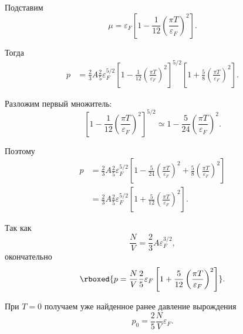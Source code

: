 \documentclass[../final.tex]{subfiles}
\begin{document}
Подставим
%
\begin{equation*}
    \mu
    =
    \varepsilon_F
    \left[
        1
        -
        \frac{1}{12}
        \left(
            \frac{\pi T}{\varepsilon_F}
        \right)^2
    \right].
\end{equation*}

Тогда
%
\begin{align*}
    p
    &=
    \frac{2}{3}A
    \frac{2}{5}
    \varepsilon_F^{5/2}
    \left[
        1
        -
        \frac{1}{12}
        \left(
            \frac{\pi T}{\varepsilon_F}
        \right)^2
    \right]^{5/2}
    \left[
        1
        +
        \frac{5}{8}
        \left(
            \frac{\pi T}{\varepsilon_F}
        \right)^2
    \right].
\end{align*}

Разложим первый множитель:
%
\begin{equation*}
    \left[
        1
        -
        \frac{1}{12}
        \left(
            \frac{\pi T}{\varepsilon_F}
        \right)^2
    \right]^{5/2}
    \simeq
    1
    -
    \frac{5}{24}
    \left(
        \frac{\pi T}{\varepsilon_F}
    \right)^2.
\end{equation*}

Поэтому
%
\begin{align*}
    p
    &=
    \frac{2}{3}A
    \frac{2}{5}
    \varepsilon_F^{5/2}
    \left[
        1
        -
        \frac{5}{24}
        \left(
            \frac{\pi T}{\varepsilon_F}
        \right)^2
        +
        \frac{5}{8}
        \left(
            \frac{\pi T}{\varepsilon_F}
        \right)^2
    \right]
    \\[6pt]
    &=
    \frac{2}{3}A
    \frac{2}{5}
    \varepsilon_F^{5/2}
    \left[
        1
        +
        \frac{5}{12}
        \left(
            \frac{\pi T}{\varepsilon_F}
        \right)^2
    \right].
\end{align*}

Так как
%
\begin{equation*}
    \frac{N}{V}
    =
    \frac{2}{3}A
    \varepsilon_F^{3/2},
\end{equation*}
%
окончательно
%
\[
    \rboxed{
        p
        =
        \frac{N}{V}
        \frac{2}{5}
        \varepsilon_F
        \left[
            1
            +
            \frac{5}{12}
            \left(
                \frac{\pi T}{\varepsilon_F}
            \right)^2
        \right]
    }.
\]

При $T=0$ получаем уже найденное ранее давление вырождения
%
\begin{equation*}
    p_0
    =
    \frac{2}{5}
    \frac{N}{V}
    \varepsilon_F.
\end{equation*}
\end{document}
